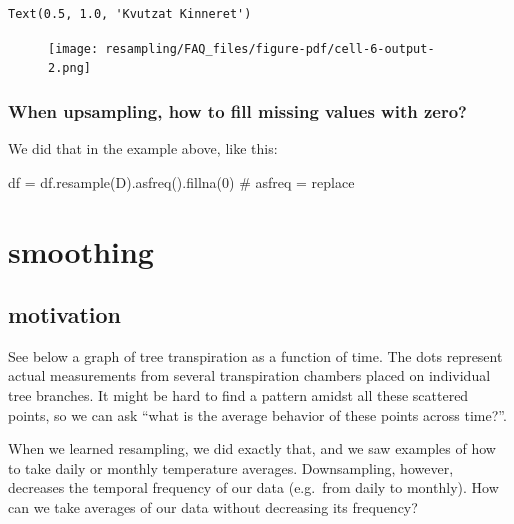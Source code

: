 \documentclass[
  letterpaper,
  DIV=11,
  numbers=noendperiod,
  oneside]{scrreprt}
\newenvironment{Shaded}{\begin{snugshade}}{\end{snugshade}}
\newcommand{\CommentTok}[1]{\textcolor[rgb]{0.37,0.37,0.37}{#1}}
\newcommand{\DecValTok}[1]{\textcolor[rgb]{0.68,0.00,0.00}{#1}}
\newcommand{\NormalTok}[1]{\textcolor[rgb]{0.00,0.23,0.31}{#1}}
\newcommand{\OperatorTok}[1]{\textcolor[rgb]{0.37,0.37,0.37}{#1}}
\newcommand{\StringTok}[1]{\textcolor[rgb]{0.13,0.47,0.30}{#1}}
\begin{document}
\begin{verbatim}
Text(0.5, 1.0, 'Kvutzat Kinneret')
\end{verbatim}

\begin{figure}[H]

{\centering \texttt{[image: resampling/FAQ\_files/figure-pdf/cell-6-output-2.png]}

}

\end{figure}

\hypertarget{when-upsampling-how-to-fill-missing-values-with-zero}{%
\section{When upsampling, how to fill missing values with
zero?}\label{when-upsampling-how-to-fill-missing-values-with-zero}}

We did that in the example above, like this:

\begin{Shaded}
\begin{Highlighting}[]
\NormalTok{df }\OperatorTok{=}\NormalTok{ df.resample(}\StringTok{\textquotesingle{}D\textquotesingle{}}\NormalTok{).asfreq().fillna(}\DecValTok{0}\NormalTok{)  }\CommentTok{\# asfreq = replace}
\end{Highlighting}
\end{Shaded}

\part{smoothing}

\hypertarget{motivation-1}{%
\chapter{motivation}\label{motivation-1}}

See below a graph of tree transpiration as a function of time. The dots
represent actual measurements from several transpiration chambers placed
on individual tree branches. It might be hard to find a pattern amidst
all these scattered points, so we can ask ``what is the average behavior
of these points across time?''.

When we learned resampling, we did exactly that, and we saw examples of
how to take daily or monthly temperature averages. Downsampling,
however, decreases the temporal frequency of our data (e.g.~from daily
to monthly). How can we take averages of our data without decreasing its
frequency?
\end{document}
